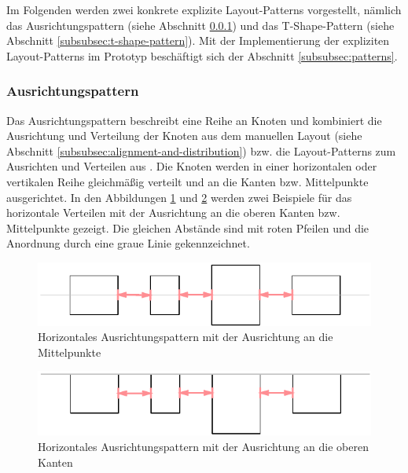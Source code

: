 Im Folgenden werden zwei konkrete explizite Layout-Patterns vorgestellt, nämlich das Ausrichtungspattern (siehe Abschnitt \ref{subsubsec:alignment-pattern}) und das T-Shape-Pattern (siehe Abschnitt \ref{subsubsec:t-shape-pattern}). Mit der Implementierung der expliziten Layout-Patterns im Prototyp beschäftigt sich der Abschnitt \ref{subsubsec:patterns}.

\subsubsection{Ausrichtungspattern}
\label{subsubsec:alignment-pattern}

Das Ausrichtungspattern beschreibt eine Reihe an Knoten und kombiniert die Ausrichtung und Verteilung der Knoten aus dem manuellen Layout (siehe Abschnitt \ref{subsubsec:alignment-and-distribution}) bzw. die Layout-Patterns zum Ausrichten und Verteilen aus \cite[S.143ff und S.136ff]{Maier12A-Pattern-based}. Die Knoten werden in einer horizontalen oder vertikalen Reihe gleichmäßig verteilt und an die Kanten bzw. Mittelpunkte ausgerichtet. In den Abbildungen \ref{fig:layout-pattern-alignment-center} und \ref{fig:layout-pattern-alignment-top} werden zwei Beispiele für das horizontale Verteilen mit der Ausrichtung an die oberen Kanten bzw. Mittelpunkte gezeigt. Die gleichen Abstände sind mit roten Pfeilen und die Anordnung durch eine graue Linie gekennzeichnet.

\begin{figure}[hbt]
    \centering
    \includegraphics{resources/layout-pattern-alignment-center}
    \caption{Horizontales Ausrichtungspattern mit der Ausrichtung an die Mittelpunkte}
    \label{fig:layout-pattern-alignment-center}
\end{figure}

\begin{figure}[hbt]
    \centering
    \includegraphics{resources/layout-pattern-alignment-top}
    \caption{Horizontales Ausrichtungspattern mit der Ausrichtung an die oberen Kanten}
    \label{fig:layout-pattern-alignment-top}
\end{figure}

